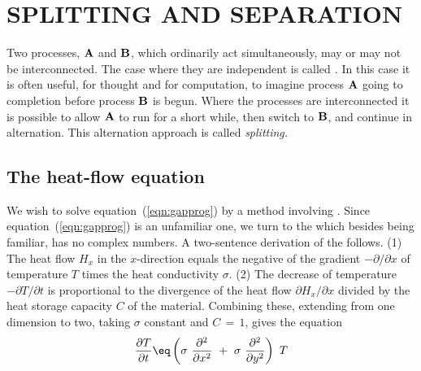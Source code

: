 \section{SPLITTING AND SEPARATION}
\def\I{ {\bf I} }
\def\A{ {\bf A} }
\def\B{ {\bf B} }
\par
Two processes,  $\A$  and  $\B$, which ordinarily
act simultaneously, may or may not be interconnected.
The case where they are independent is called
{\em 
{}.
}
In this case it is often useful,
for thought and for computation,
to imagine process  $\A$  going to completion
before process  $\B$  is begun.
Where the processes are interconnected
it is possible to allow  $\A$  to run for a short while,
then switch to  $\B$, and continue in alternation.
This
alternation approach is called 
{\em  splitting.}
\subsection{The heat-flow equation}
We wish to solve equation~(\ref{eqn:gapprog})
by a method involving .
Since equation~(\ref{eqn:gapprog})
is an unfamiliar one,
we turn to the 
which besides being familiar, has no complex numbers.
A two-sentence derivation of the  follows.
\label{'HeatDerivation'}
(1) The heat
flow  $H_x$  in the  $x$-direction equals the
negative of the gradient  $- \partial / \partial x$  of
temperature  $T$  times the heat conductivity  $\sigma$.
(2)  The decrease of temperature  $- \partial T / \partial t$  is
proportional to the divergence
of the  heat flow  $\partial H_x / \partial x$  divided by
the heat storage capacity  $C$  of the
material.
Combining these, extending from one
dimension to two, taking  $\sigma$  constant and  $C \,=\, 1$,
gives the equation
\begin{equation}
{ \partial T  \over \partial t} \eq
\left(
        \sigma\ {\partial^2  \over \partial x^2}
        \ +\ 
        \sigma\ {\partial^2  \over \partial y^2}
\right)\ T
\label{eqn:heatfloweqn}
\end{equation}

